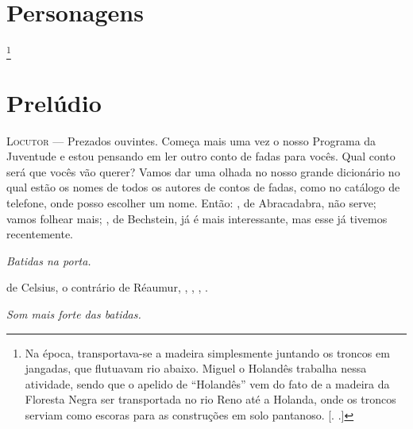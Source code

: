 \section{Personagens}

\begin{myparindent}{0pt}



\footnote{Na época, transportava-se a madeira
  simplesmente juntando os troncos em jangadas, que flutuavam rio
  abaixo. Miguel o Holandês trabalha nessa atividade, sendo que o
  apelido de ``Holandês'' vem do fato de a madeira da Floresta Negra ser
  transportada no rio Reno até a Holanda, onde os troncos serviam como
  escoras para as construções em solo pantanoso. [. .]}











\section{Prelúdio}

\begin{Parskip}
\textsc{Locutor} --- Prezados ouvintes. Começa mais uma vez o nosso Programa da
Juventude e estou pensando em ler outro conto de fadas para vocês. Qual
conto será que vocês vão querer? Vamos dar uma olhada no nosso grande
dicionário no qual estão os nomes de todos os autores de contos de
fadas, como no catálogo de telefone, onde posso escolher um nome. Então:
, de Abracadabra, não serve; vamos folhear mais; , de Bechstein, já é
mais interessante, mas esse já tivemos recentemente.

\emph{Batidas na porta.}

 de Celsius, o contrário de Réaumur, , , , .

\emph{Som mais forte das batidas.}


\end{Parskip}
\end{myparindent}
